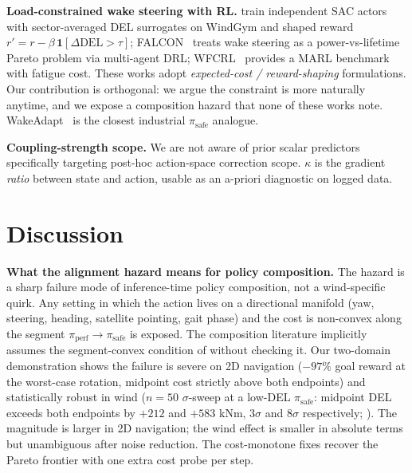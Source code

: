 \documentclass{article}
\begin{document}
\textbf{Load-constrained wake steering with RL.}
\citet{multiobj2026loadwake} train independent SAC actors with sector-averaged DEL surrogates on WindGym and shaped reward $r' = r - \beta\,\mathbf{1}[\Delta\mathrm{DEL} > \tau]$; FALCON~\citep{falcon2021} treats wake steering as a power-vs-lifetime Pareto problem via multi-agent DRL; WFCRL~\citep{wfcrl2025} provides a MARL benchmark with fatigue cost.
These works adopt \emph{expected-cost / reward-shaping} formulations.
Our contribution is orthogonal: we argue the constraint is more naturally anytime, and we expose a composition hazard that none of these works note.
WakeAdapt~\citep{siemensWakeAdapt} is the closest industrial $\pi_{\mathrm{safe}}$ analogue.

\textbf{Coupling-strength scope.}
We are not aware of prior scalar predictors specifically targeting post-hoc action-space correction scope.
$\kappa$ is the gradient \emph{ratio} between state and action, usable as an a-priori diagnostic on logged data.

\section{Discussion}
\label{sec:discussion}

\textbf{What the alignment hazard means for policy composition.}
The hazard is a sharp failure mode of inference-time policy composition, not a wind-specific quirk.
Any setting in which the action lives on a directional manifold (yaw, steering, heading, satellite pointing, gait phase) and the cost is non-convex along the segment $\pi_{\mathrm{perf}}\!\to\!\pi_{\mathrm{safe}}$ is exposed.
The composition literature implicitly assumes the segment-convex condition of  without checking it.
Our two-domain demonstration shows the failure is severe on 2D navigation ($-97\%$ goal reward at the worst-case rotation, midpoint cost strictly above both endpoints) and statistically robust in wind ($n=50$ $\sigma$-sweep at a low-DEL $\pi_{\mathrm{safe}}$: midpoint DEL exceeds both endpoints by $+212$ and $+583$ kNm, $3\sigma$ and $8\sigma$ respectively; ). The magnitude is larger in 2D navigation; the wind effect is smaller in absolute terms but unambiguous after noise reduction. The cost-monotone fixes recover the Pareto frontier with one extra cost probe per step.
\end{document}
